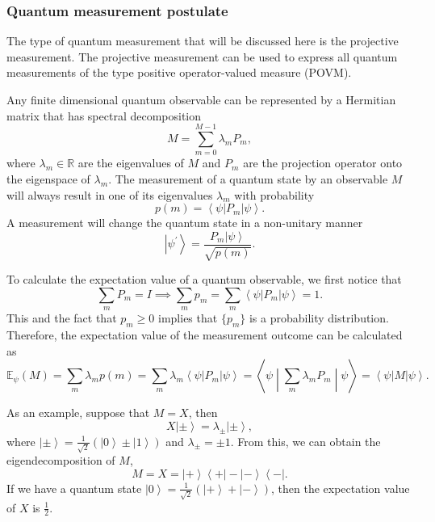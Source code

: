 \documentclass[11pt]{article}
\newcommand{\braketmatrix}[3]{\left \langle #1 \middle| #2 \middle| #3 \right \rangle}
\newcommand{\bra}[1]{\left\langle #1\right|}
\newcommand{\ket}[1]{\left|#1\right\rangle}
\begin{document}
\subsubsection{Quantum measurement postulate}
The type of quantum measurement that will be discussed here is the projective measurement. The projective measurement can be used to express all quantum measurements of the type positive operator-valued measure (POVM).

Any finite dimensional quantum observable can be represented by a Hermitian matrix that has spectral decomposition
\begin{equation}
    M = \sum_{m=0}^{M-1}\lambda_mP_m,
\end{equation}
where $\lambda_m \in \mathbb{R}$ are the eigenvalues of $M$ and $P_m$ are the projection operator onto the eigenspace of $\lambda_m$.  
The measurement of a quantum state by an observable $M$ will always result in one of its eigenvalues $\lambda_m$ with probability 
\begin{equation}
    p(m) = \bra{\psi}P_m\ket{\psi}.
\end{equation}
A measurement will change the quantum state in a non-unitary manner 
\begin{equation}
    \ket{\psi^{'}} = \frac{P_m\ket{\psi}}{\sqrt{p(m)}}.
\end{equation}

To calculate the expectation value of a quantum observable, we first notice that 
\begin{equation}
    \sum_mP_m = I \implies \sum_mp_m = \sum_m\bra{\psi}P_m\ket{\psi} = 1.
\end{equation}
This and the fact that $p_m \geq 0$ implies that $\{p_m\}$ is a probability distribution. 
Therefore, the expectation value of the measurement outcome can be calculated as 
\begin{equation}
    \mathbb{E}_\psi(M) = \sum_m\lambda_mp(m) = \sum_m\lambda_m\bra{\psi}P_m\ket{\psi} = \braketmatrix{\psi}{\sum_m\lambda_mP_m}{\psi}=\bra{\psi}M\ket{\psi}.
\end{equation}

As an example, suppose that $M = X$, then
\begin{equation}
    X\ket{\pm} = \lambda_{\pm}\ket{\pm},
\end{equation}
where $\ket{\pm} = \frac{1}{\sqrt{2}}(\ket{0} \pm \ket{1})$ and $\lambda_{\pm} = \pm 1$. From this, we can obtain the eigendecomposition of $M$,
\begin{equation}
    M = X = \ket{+}\bra{+} - \ket{-}\bra{-}.
\end{equation}
If we have a quantum state $\ket{0} = \frac{1}{\sqrt{2}}(\ket{+} + \ket{-})$, then the expectation value of $X$ is $\frac{1}{2}$.
\end{document}
